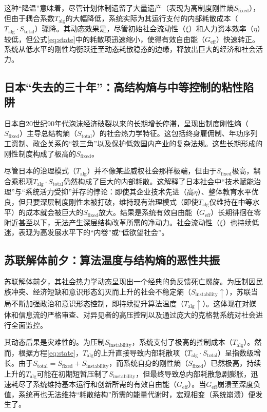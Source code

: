\documentclass[twocolumn]{ctexart}
\newcommand{\upxi}{\xi}
\newcommand{\upeta}{\eta}
\newcommand{\Sfix}{S_{\mathrm{fixed}}}
\newcommand{\Sinst}{S_{\mathrm{instability}}}
\newcommand{\Stot}{S_{\mathrm{total}}}
\newcommand{\Talg}{T_{\mathrm{alg}}}
\newcommand{\Geff}{G_{\mathrm{eff}}}
\begin{document}
这种“降温”意味着，尽管计划体制遗留了大量遗产（表现为高制度刚性熵$\Sfix$），但由于耦合系数$\Talg$的大幅降低，系统实际为其运行支付的内部耗散成本（$\Talg\cdot\Stot$）骤降。其动态效果是，尽管初始社会流动性（$\upxi$）和人力资本效率（$\upeta$）较低，但公式\eqref{eq:state}中的耗散项迅速缩小，使得有效自由能（$\Geff$）快速转正。系统从低水平的刚性均衡跃迁至动态耗散稳态的边缘，释放出巨大的经济和社会活力。

\subsection{日本“失去的三十年”：高结构熵与中等控制的粘性陷阱}

日本自20世纪90年代泡沫经济破裂以来的长期增长停滞，呈现出制度刚性熵（$\Sfix$）主导总结构熵（$\Stot$）的社会热力学特征。这包括终身雇佣制、年功序列工资制、政企关系的“铁三角”以及保护低效国内产业的复杂法规。这些长期形成的刚性制度构成了极高的$\Sfix$。

尽管日本的治理模式（$\Talg$）并不像某些威权社会那样极端，但由于$\Sfix$极高，耦合乘积项$\Talg\cdot\Stot$仍然构成了巨大的内部耗散。这解释了日本社会中“技术赋能治理”与“系统活力受抑”并存的悖论：即使其企业技术先进（高$\upeta$）、整体教育水平优良，但只要深层制度刚性未被打破，维持现有治理模式（即使$\Talg$仅维持在中等水平）的成本就会被巨大的$\Sfix$放大。结果是系统有效自由能（$\Geff$）长期徘徊在零附近甚至以下，无法产生深层结构改革所需的净动力。社会流动性（$\upxi$）也持续低迷，表现为高发展水平下的“内卷”或“低欲望社会”。

\subsection{苏联解体前夕：算法温度与结构熵的恶性共振}

苏联解体前夕，其社会热力学动态呈现出一个经典的负反馈死亡螺旋。为压制因民族冲突、经济短缺和意识形态幻灭而上升的社会不稳定熵（$\Sinst\uparrow$），苏联当局不断加强政治和意识形态控制，即持续提升算法温度（$\Talg\uparrow$）。这体现在对媒体和信息流的严格审查、对异见者的高压控制以及通过庞大的克格勃系统对社会进行全面监控。

其动态后果是灾难性的。为压制$\Sinst$，系统支付了极高的控制成本（$\Talg$）。然而，根据方程\eqref{eq:state}，$\Talg$的上升直接导致内部耗散项（$\Talg\cdot\Stot$）呈指数级增长。由于$\Stot = \Sfix + \Sinst$，而系统自身的刚性熵（$\Sfix$）已然极高，持续上升的$\Talg$可能在初期短暂压制了$\Sinst$，但最终导致总内部耗散急剧膨胀，迅速耗尽了系统维持基本运行和创新所需的有效自由能（$\Geff$）。当$\Geff$崩溃至深度负值，系统再也无法维持“耗散结构”所需的能量代谢时，宏观相变（系统崩溃）便发生了。
\end{document}
